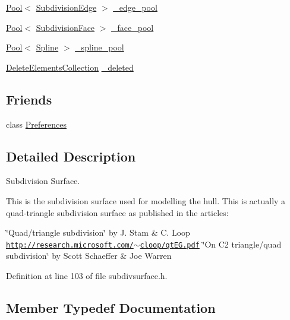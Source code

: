 \begin{DoxyCompactItemize}
\hyperlink{classPool}{Pool}$<$ \hyperlink{classShipCAD_1_1SubdivisionEdge}{Subdivision\+Edge} $>$ \hyperlink{classShipCAD_1_1SubdivisionSurface_a47d61792772139e74bebfb11eaea21a7}{\+\_\+edge\+\_\+pool}
\item 
\hyperlink{classPool}{Pool}$<$ \hyperlink{classShipCAD_1_1SubdivisionFace}{Subdivision\+Face} $>$ \hyperlink{classShipCAD_1_1SubdivisionSurface_a6064ab4cdadae400c79c4cbcba906b3a}{\+\_\+face\+\_\+pool}
\item 
\hyperlink{classPool}{Pool}$<$ \hyperlink{classShipCAD_1_1Spline}{Spline} $>$ \hyperlink{classShipCAD_1_1SubdivisionSurface_acfa427b1b9a8582382fcb2a7de95553f}{\+\_\+spline\+\_\+pool}
\item 
\hyperlink{classShipCAD_1_1DeleteElementsCollection}{Delete\+Elements\+Collection} \hyperlink{classShipCAD_1_1SubdivisionSurface_a7ffa4a7be62b7e5931dd70fce9c885ee}{\+\_\+deleted}
\end{DoxyCompactItemize}
\subsection*{Friends}
\begin{DoxyCompactItemize}
\item 
class \hyperlink{classShipCAD_1_1SubdivisionSurface_aac5731b90dac5ab98f6153447ce63674}{Preferences}
\end{DoxyCompactItemize}


\subsection{Detailed Description}
Subdivision Surface. 

This is the subdivision surface used for modelling the hull. This is actually a quad-\/triangle subdivision surface as published in the articles\+:

\char`\"{}\+Quad/triangle subdivision\char`\"{} by J. Stam \& C. Loop \href{http://research.microsoft.com/~cloop/qtEG.pdf}{\tt http\+://research.\+microsoft.\+com/$\sim$cloop/qt\+E\+G.\+pdf} \char`\"{}\+On C2 triangle/quad subdivision\char`\"{} by Scott Schaeffer \& Joe Warren 

Definition at line 103 of file subdivsurface.\+h.



\subsection{Member Typedef Documentation}
